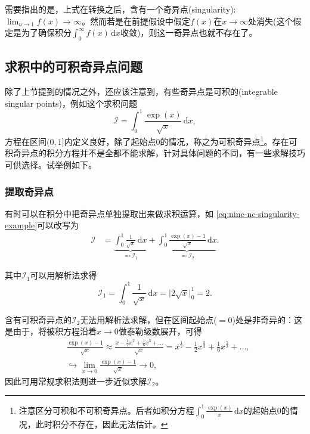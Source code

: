 需要指出的是，上式在转换之后，含有一个奇异点(singularity):$\lim_{u \rightarrow 1} f(x) \rightarrow \infty$。然而若是在前提假设中假定$f(x)$在$x \rightarrow \infty$处消失(这个假定是为了确保积分$\int_{0}^{\infty} f(x) \, \mathrm{d} x$收敛)，则这一奇异点也就不存在了。

\subsection{求积中的可积奇异点问题}
\label{sec:ninc-nc-singularity}
除了上节提到的情况之外，还应该注意到，有些奇异点是可积的(integrable singular points)，例如这个求积问题
\begin{equation}
  \label{eq:ninc-nc-singularity-example}
  \mathcal{I} = \int_{0}^{1} \frac{\exp(x)}{\sqrt{x}} \, \mathrm{d} x,
\end{equation}
方程在区间$(0,1]$内定义良好，除了起始点$0$的情况，称之为可积奇异点\footnote{注意区分可积和不可积奇异点。后者如积分方程$\int_{0}^{1} \frac{\exp (x)}{x} \, \mathrm{d} x $的起始点$0$的情况，此时积分不存在，因此无法估计。}。存在可积奇异点的积分方程并不是全都不能求解，针对具体问题的不同，有一些求解技巧可供选择。试举例如下。

\subsubsection{提取奇异点}
\label{sec:ninc-nc-singularity-isolation}
有时可以在积分中把奇异点单独提取出来做求积运算，如  \eqref{eq:ninc-nc-singularity-example}可以改写为
\begin{equation*}
  \begin{split}
    \mathcal{I} & =
    \underbrace{
    \int_{0}^{1} \frac{1}{\sqrt{x}} \, \mathrm{d} x
    }_{\eqqcolon \mathcal{I}_{1}}
    + \underbrace{
    \int_{0}^{1} \frac{
    \exp (x) -1
    }{\sqrt{x}} \, \mathrm{d} x
    }_{\eqqcolon \mathcal{I}_{2}}.
  \end{split}
\end{equation*}

其中$\mathcal{I}_{1}$可以用解析法求得
\begin{equation*}
  \mathcal{I}_{1} = \int_{0}^{1} \frac{1}{\sqrt{x}} \, \mathrm{d} x = \big| 2 \sqrt{x} \big|_{0}^{1} = 2.
\end{equation*}

含有可积奇异点的$\mathcal{I}_{2}$无法用解析法求解，但在区间起始点($=0$)处是非奇异的：这是由于，将被积方程沿着$x \rightarrow 0$做泰勒级数展开，可得
\begin{equation*}
  \begin{split}
    & \frac{
    \exp (x) -1
    }{\sqrt{x}}
    \approx \frac{
    x - \frac{1}{2}x^{2} + \frac{1}{6} x^{3} + \ldots
    }{
    \sqrt{x}
    } = x^{\frac{1}{2}} - \frac{1}{2}x^{\frac{3}{2}} + \frac{1}{6} x^{\frac{5}{2}} + \ldots, \\
    & \hookrightarrow \lim_{x \rightarrow 0}
    \frac{
    \exp (x) -1
    }{\sqrt{x}} \rightarrow 0,
  \end{split}
\end{equation*}
因此可用常规求积法则进一步近似求解$\mathcal{I}_{2}$。

